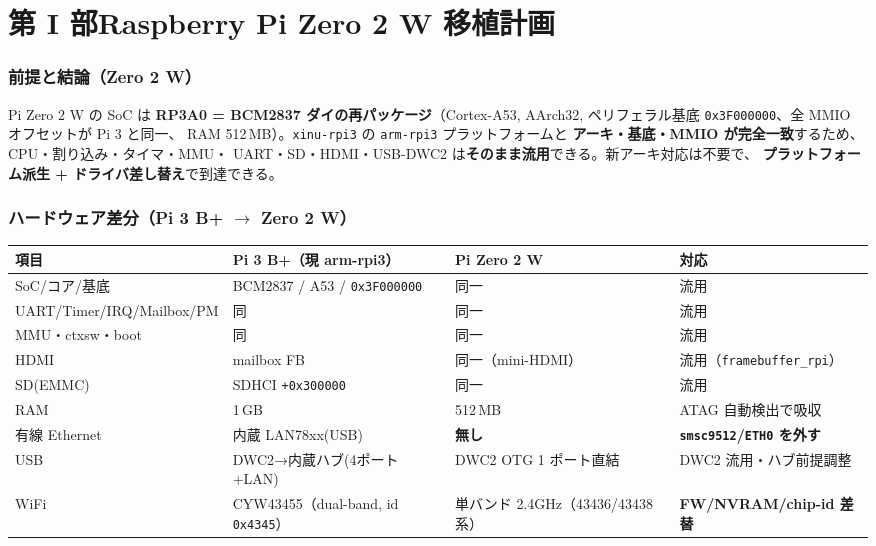 \documentclass[a4paper,11pt]{ltjsarticle}
\begin{document}
\part*{第 I 部\quad Raspberry Pi Zero 2 W 移植計画}

\section{前提と結論（Zero 2 W）}
Pi Zero 2 W の SoC は \textbf{RP3A0 = BCM2837 ダイの再パッケージ}（Cortex-A53,
AArch32, ペリフェラル基底 \texttt{0x3F000000}、全 MMIO オフセットが Pi 3 と同一、
RAM 512\,MB）。\texttt{xinu-rpi3} の \texttt{arm-rpi3} プラットフォームと
\textbf{アーキ・基底・MMIO が完全一致}するため、CPU・割り込み・タイマ・MMU・
UART・SD・HDMI・USB-DWC2 は\textbf{そのまま流用}できる。新アーキ対応は不要で、
\textbf{プラットフォーム派生 + ドライバ差し替え}で到達できる。

\section{ハードウェア差分（Pi 3 B+ $\rightarrow$ Zero 2 W）}
\begin{center}\small
\begin{longtable}{@{}lp{4.0cm}p{4.0cm}p{3.4cm}@{}}
\toprule
項目 & Pi 3 B+（現 arm-rpi3） & Pi Zero 2 W & 対応\\
\midrule \endhead
SoC/コア/基底 & BCM2837 / A53 / \texttt{0x3F000000} & 同一 & 流用\\
UART/Timer/IRQ/Mailbox/PM & 同 & 同一 & 流用\\
MMU・ctxsw・boot & 同 & 同一 & 流用\\
HDMI & mailbox FB & 同一（mini-HDMI） & 流用（\texttt{framebuffer\_rpi}）\\
SD(EMMC) & SDHCI \texttt{+0x300000} & 同一 & 流用\\
RAM & 1\,GB & 512\,MB & ATAG 自動検出で吸収\\
有線 Ethernet & 内蔵 LAN78xx(USB) & \textbf{無し} & \textbf{\texttt{smsc9512}/\texttt{ETH0} を外す}\\
USB & DWC2→内蔵ハブ(4ポート+LAN) & DWC2 OTG 1 ポート直結 & DWC2 流用・ハブ前提調整\\
WiFi & CYW43455（dual-band, id \texttt{0x4345}） & 単バンド 2.4GHz（43436/43438 系） & \textbf{FW/NVRAM/chip-id 差替}\\
\bottomrule
\end{longtable}
\end{center}
\end{document}
